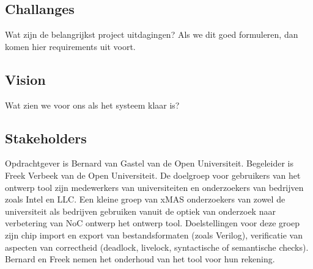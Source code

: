 \subsection{Challanges}

Wat zijn de belangrijkst project uitdagingen? Als we dit goed formuleren, dan komen hier
requirements uit voort.

\subsection{Vision}

Wat zien we voor ons als het systeem klaar is?

\subsection{Stakeholders}

Opdrachtgever is Bernard van Gastel van de Open Universiteit. Begeleider is Freek Verbeek van de Open Universiteit.
De doelgroep voor gebruikers van het ontwerp tool zijn medewerkers van universiteiten en onderzoekers van bedrijven zoals
Intel en LLC. Een kleine groep van xMAS onderzoekers van zowel de universiteit als bedrijven gebruiken vanuit de optiek
van onderzoek naar verbetering van NoC ontwerp het ontwerp tool. Doelstellingen voor deze groep zijn chip import
en export van bestandsformaten (zoals Verilog), verificatie van aspecten van correctheid (deadlock, livelock,
syntactische of semantische checks). Bernard en Freek nemen het onderhoud van het tool voor hun rekening.


